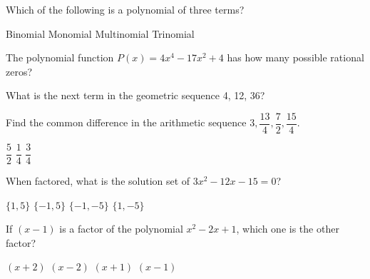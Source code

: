 \begin{questions}
\question Which of the following is a  polynomial of  three terms? 
\begin{multicols}{4}
\begin{choices}  
\choice Binomial 
\choice Monomial 
\choice Multinomial 
\CorrectChoice Trinomial 
\end{choices}
\end{multicols} 

\question The polynomial  function $P(x) = 4x^4  - 17x^2 + 4$ has how many  possible rational zeros?
\begin{multicols}{4}
\begin{choices} 
\end{choices}
\end{multicols} 

\question What is the next term in the geometric sequence  4, 12, 36? 
\begin{multicols}{4}
\begin{choices} 
\end{choices}
\end{multicols} 

\question Find the common difference in the arithmetic sequence $3, \dfrac{13}{4}, \dfrac{7}{2}, \dfrac{15}{4}$. 
\begin{multicols}{4}
\begin{choices}  
\choice $\dfrac{5}{2}$ 
\CorrectChoice $\dfrac{1}{4}$ 
\choice $\dfrac{3}{4}$ 
\end{choices}
\end{multicols} 

\question When factored, what is the solution set of $3 x^{2} - 12 x - 15=0$?
\begin{multicols}{4}
\begin{choices}  
\choice $\{1, 5\}$
\CorrectChoice $\{-1, 5\}$
\choice $\{-1, -5\}$
\choice $\{1, -5\}$
\end{choices}
\end{multicols} 


\question If $(x-1)$ is a factor of the polynomial $x^2 - 2x + 1$, which one is the other factor?
\begin{multicols}{4}
\begin{choices}  
\choice $(x+2)$
\choice $(x-2)$
\choice $(x+1)$
\CorrectChoice $(x-1)$
\end{choices}
\end{multicols}%


\end{questions}
